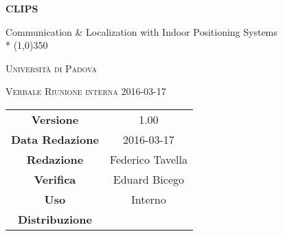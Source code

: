 \documentclass[a4paper,12pt]{article}
\author{Federico Tavella}
\date{17/03/2016}
\begin{document}
\begin{titlepage}
	\centering
	{\huge\bfseries CLIPS\par}
	Communication \& Localization with Indoor Positioning Systems \\*
	\line(1,0){350} \\
	{\scshape\LARGE Università di Padova \par}
	\vspace{1cm}
	{\scshape\Large Verbale Riunione interna 2016-03-17 \par}
	\logo
	\newpage
	\begin{tabular}{c|c}
		{\hfill \textbf{Versione}} 			& 1.00				\\
		{\hfill\textbf{Data Redazione}} 	& 2016-03-17  		\\
		{\hfill\textbf{Redazione}} 			& Federico Tavella	\\
		{\hfill\textbf{Verifica}} 			& Eduard Bicego		\\
		{\hfill\textbf{Uso}} 				& Interno			\\
		{\hfill\textbf{Distribuzione}} 		& \leaf\			\\
	\end{tabular}
\end{titlepage}
	
	\newpage

	
	\label{LastFrontPage}
	

	\newpage
	
	\pagestyle{mymain}
	
	
		

	
		
	
		
	
		\newpage
		
				
	\label{LastPage}
\end{document}
